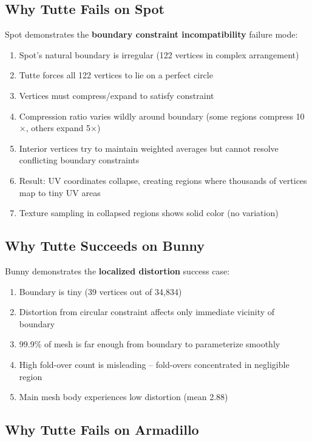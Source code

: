 \documentclass[11pt]{article}
\begin{document}
\subsection{Why Tutte Fails on Spot}

Spot demonstrates the \textbf{boundary constraint incompatibility} failure mode:

\begin{enumerate}
    \item Spot's natural boundary is irregular (122 vertices in complex arrangement)
    \item Tutte forces all 122 vertices to lie on a perfect circle
    \item Vertices must compress/expand to satisfy constraint
    \item Compression ratio varies wildly around boundary (some regions compress 10$\times$, others expand 5$\times$)
    \item Interior vertices try to maintain weighted averages but cannot resolve conflicting boundary constraints
    \item Result: UV coordinates collapse, creating regions where thousands of vertices map to tiny UV areas
    \item Texture sampling in collapsed regions shows solid color (no variation)
\end{enumerate}

\subsection{Why Tutte Succeeds on Bunny}

Bunny demonstrates the \textbf{localized distortion} success case:

\begin{enumerate}
    \item Boundary is tiny (39 vertices out of 34,834)
    \item Distortion from circular constraint affects only immediate vicinity of boundary
    \item 99.9\% of mesh is far enough from boundary to parameterize smoothly
    \item High fold-over count is misleading -- fold-overs concentrated in negligible region
    \item Main mesh body experiences low distortion (mean 2.88)
\end{enumerate}

\subsection{Why Tutte Fails on Armadillo}
\end{document}
